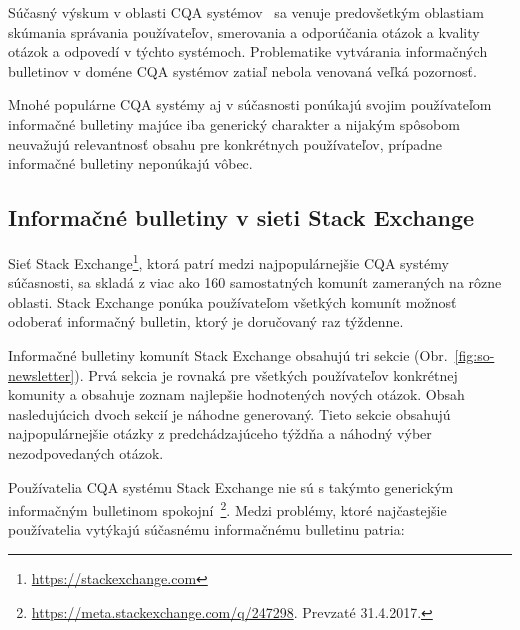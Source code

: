 Súčasný výskum v oblasti CQA systémov~\cite{Srba2016} sa venuje predovšetkým oblastiam skúmania správania používateľov,
smerovania a odporúčania otázok a kvality otázok a odpovedí v týchto systémoch. Problematike vytvárania informačných
bulletinov v doméne CQA systémov zatiaľ nebola venovaná veľká pozornosť.

Mnohé populárne CQA systémy aj v súčasnosti ponúkajú svojim používateľom informačné bulletiny majúce iba generický
charakter a nijakým spôsobom neuvažujú relevantnosť obsahu pre konkrétnych používateľov, prípadne informačné bulletiny
neponúkajú vôbec.

\subsection{Informačné bulletiny v sieti Stack Exchange}\label{so-newsletter}

Sieť Stack Exchange\footnote{ \url{https://stackexchange.com}}, ktorá patrí medzi najpopulárnejšie CQA systémy súčasnosti,
sa skladá z viac ako 160 samostatných komunít zameraných na rôzne oblasti. Stack Exchange ponúka používateľom všetkých
komunít možnosť odoberať informačný bulletin, ktorý je doručovaný raz týždenne.

Informačné bulletiny komunít Stack Exchange obsahujú tri sekcie (Obr.~\ref{fig:so-newsletter}). Prvá sekcia je rovnaká
pre všetkých používateľov konkrétnej komunity a obsahuje zoznam najlepšie hodnotených nových otázok.
Obsah nasledujúcich dvoch sekcií je náhodne generovaný. Tieto sekcie obsahujú najpopulárnejšie otázky z predchádzajúceho
týždňa a náhodný výber nezodpovedaných otázok.

Používatelia CQA systému Stack Exchange nie sú s takýmto generickým informačným bulletinom
spokojní~\footnote{\url{https://meta.stackexchange.com/q/247298}. Prevzaté 31.4.2017.}. Medzi problémy, ktoré najčastejšie
používatelia vytýkajú súčasnému informačnému bulletinu patria:

